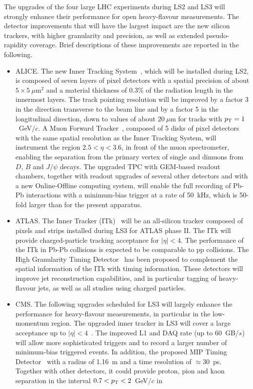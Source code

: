 The upgrades of the four large LHC experiments during LS2 and LS3 will strongly enhance their performance for open heavy-flavour measurements. The detector improvements that will have the largest impact are the new silicon trackers, with higher granularity and precision, as well as extended pseudo-rapidity coverage. Brief descriptions of these improvements are reported in the following.

\begin{itemize}
\item ALICE. The new Inner Tracking System~\cite{Abelev:1625842}, which will be installed during LS2, is composed of seven layers of pixel detectors with a spatial precision of about $5\times 5~\mu$m$^2$ and a material thickness of 0.3\% of the radiation length in the innermost layers. The track pointing resolution will be improved by a factor 3 in the direction transverse to the beam line and by a factor 5 in the longitudinal direction, down to values of about $20~\mu$m for tracks with $p\sb{\scriptstyle\mathrm{T}}=1$~GeV$/c$. A Muon Forward Tracker~\cite{CERN-LHCC-2015-001}, composed of 5 disks of pixel detectors with the same spatial resolution as the Inner Tracking System, will instrument the region $2.5<\eta<3.6$, in front of the muon spectrometer, enabling the separation from the primary vertex of single and dimuons from $D$, $B$ and $J/\psi$ decays. The upgraded TPC with GEM-based readout chambers, together with readout upgrades of several other detectors and with a new Online-Offline computing system, will enable the full recording of Pb-Pb interactions with a minimum-bias trigger at a rate of 50~kHz, which is 50-fold larger than for the present apparatus.    
\item ATLAS.  The Inner Tracker (ITk)~\cite{ATL-PHYS-PUB-2016-025} will be an all-silicon tracker composed of pixels and strips installed during LS3 for ATLAS phase II.  The ITk will provide charged-particle tracking acceptance for $|\eta|<4$.  The performance of the ITk in Pb-Pb collisions is expected to be comparable to pp collisions.  The High Granularity Timing Detector~\cite{Collaboration:2623663} has been proposed to complement the spatial information of the ITk with timing information.  These detectors will improve jet reconstruction capabilities, and in particular tagging of heavy-flavour jets, as well as all studies using charged particles.
\item CMS. The following upgrades scheduled for LS3 will largely enhance the performance for heavy-flavour measurements, in particular in the low-momentum region. The upgraded inner tracker in LS3 will cover a large acceptance up to $|\eta|<4$~\cite{Contardo:2020886}. The improved L1 and DAQ rate (up to 60~GB/$s$) will allow more sophisticated triggers and to record a larger number of minimum-bias triggered events. In addition, the proposed MIP Timing Detector~\cite{Collaboration:2272264} with a radius of 1.16~m and a time resolution of $\approx 30$~ps. Together with other detectors, it could provide proton, pion and kaon separation in the interval $0.7<p\sb{\scriptstyle\mathrm{T}} < 2$~GeV$/c$ in 

\end{itemize}
